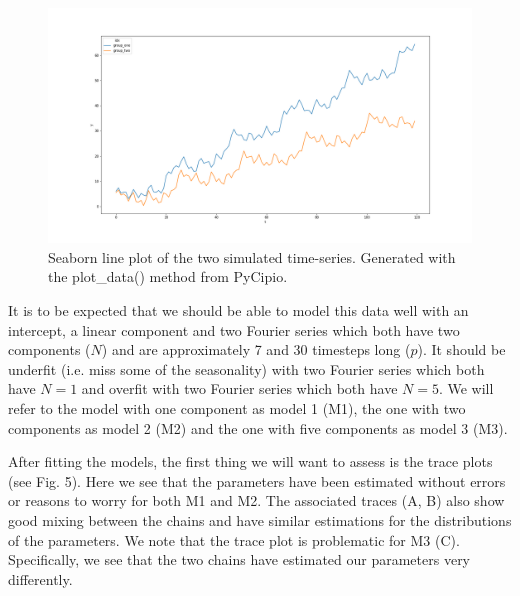 \documentclass{article}
\begin{document}
\begin{figure}[H]
    \centerline{\includegraphics[scale = 0.45]{../plots/ex1_plot_data.png}}
    \caption{Seaborn line plot of the two simulated time-series. Generated with the plot\_data() method from PyCipio.}
\end{figure}

\noindent It is to be expected that we should be able to model this data well with an intercept, a linear component and two Fourier series which both have two components ($N$) and are approximately 7 and 30 timesteps long ($p$). It should be underfit (i.e. miss some of the seasonality) with two Fourier series which both have $N = 1$ and overfit with two Fourier series which both have $N = 5$. We will refer to the model with one component as model 1 (M1), the one with two components as model 2 (M2) and the one with five components as model 3 (M3).

\noindent After fitting the models, the first thing we will want to assess is the trace plots (see Fig. 5). Here we see that the parameters have been estimated without errors or reasons to worry for both M1 and M2. The associated traces (A, B) also show good mixing between the chains and have similar estimations for the distributions of the parameters. We note that the trace plot is problematic for M3 (C). Specifically, we see that the two chains have estimated our parameters very differently.
\end{document}
